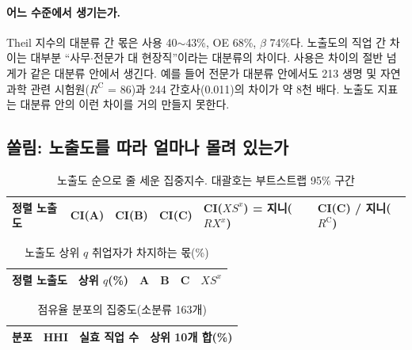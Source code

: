 \documentclass[11pt]{article}
\begin{document}
\paragraph{어느 수준에서 생기는가.} Theil 지수의 대분류 간 몫은 사용 40$\sim$43\%, OE 68\%, $\beta$ 74\%다. 노출도의 직업 간 차이는 대부분 ``사무$\cdot$전문가 대 현장직''이라는 대분류의 차이다\parencite{eloundou-2023-gpts-are-gpts-an-early}. 사용은 차이의 절반 넘게가 같은 대분류 안에서 생긴다. 예를 들어 전문가 대분류 안에서도 213 생명 및 자연과학 관련 시험원($R^{\mathrm{C}}$ = 86)과 244 간호사(0.011)의 차이가 약 8천 배다. 노출도 지표는 대분류 안의 이런 차이를 거의 만들지 못한다.

\subsection{쏠림: 노출도를 따라 얼마나 몰려 있는가}

\begin{small}
\begin{longtable}{L{3.8cm}R{2.1cm}R{2.1cm}R{2.1cm}R{2.4cm}R{2.4cm}}
\caption{노출도 순으로 줄 세운 집중지수. 대괄호는 부트스트랩 95\% 구간}\label{tab:conc}\\
\toprule
정렬 노출도 & CI(A) & CI(B) & CI(C) & CI($XS^x$) = 지니($RX^x$) & CI(C) / 지니($R^{\mathrm{C}}$) \\
\midrule
\endfirsthead

\bottomrule
\end{longtable}

\begin{longtable}{L{3.8cm}R{2.2cm}R{1.8cm}R{1.8cm}R{1.8cm}R{2.6cm}}
\caption{노출도 상위 $q$ 취업자가 차지하는 몫(\%)}\label{tab:curve}\\
\toprule
정렬 노출도 & 상위 $q$(\%) & A & B & C & $XS^x$ \\
\midrule
\endfirsthead

\bottomrule
\end{longtable}

\begin{longtable}{L{6.0cm}R{2.0cm}R{2.6cm}R{2.6cm}}
\caption{점유율 분포의 집중도(소분류 163개)}\label{tab:hhi}\\
\toprule
분포 & HHI & 실효 직업 수 & 상위 10개 합(\%) \\
\midrule
\endfirsthead

\bottomrule
\end{longtable}
\end{small}
\end{document}
